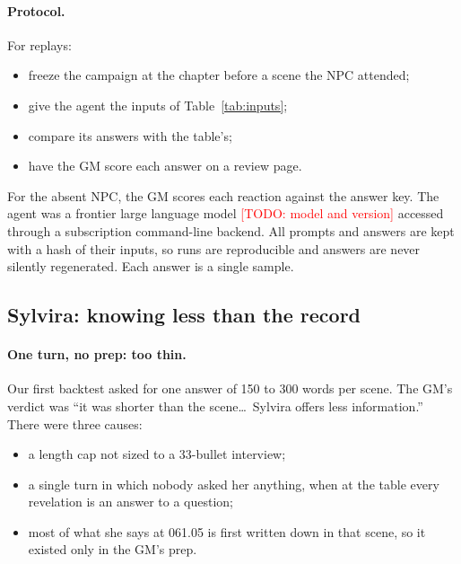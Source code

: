 \documentclass[11pt]{article}
\newcommand{\todo}[1]{\textcolor{red}{[TODO: #1]}}
\begin{document}
\paragraph{Protocol.}
For replays:
\begin{itemize}[nosep]
\item freeze the campaign at the chapter before a scene the NPC attended;
\item give the agent the inputs of Table~\ref{tab:inputs};
\item compare its answers with the table's;
\item have the GM score each answer on a review page.
\end{itemize}
For the absent NPC, the GM scores each reaction against the answer key. The agent was
a frontier large language model \todo{model and version} accessed through a
subscription command-line backend. All prompts and answers are kept with a hash of
their inputs, so runs are reproducible and answers are never silently regenerated.
Each answer is a single sample.

\subsection{Sylvira: knowing less than the record}

\paragraph{One turn, no prep: too thin.}
Our first backtest asked for one answer of 150 to 300 words per scene. The GM's
verdict was ``it was shorter than the scene\ldots\ Sylvira offers less information.''
There were three causes:
\begin{itemize}[nosep]
\item a length cap not sized to a 33-bullet interview;
\item a single turn in which nobody asked her anything, when at the table every
revelation is an answer to a question;
\item most of what she says at 061.05 is first written down in that scene, so it
existed only in the GM's prep.
\end{itemize}
\end{document}

